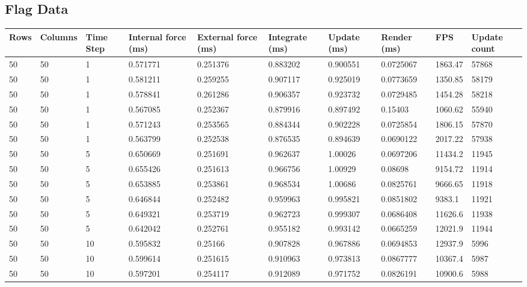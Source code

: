 \begin{landscape}
\subsection{Flag Data}

\begin{longtable}{ | l | l | l | l | l | l | l | l | l | l | }
\hline
 Rows &  Columns &  Time Step &  Internal force (ms) &  External force (ms) &  Integrate (ms) &  Update (ms) &  Render (ms) &  FPS &  Update count \\ \hline
50 & 50 & 1 & 0.571771 & 0.251376 & 0.883202 & 0.900551 & 0.0725067 & 1863.47 & 57868\\ \hline
50 & 50 & 1 & 0.581211 & 0.259255 & 0.907117 & 0.925019 & 0.0773659 & 1350.85 & 58179\\ \hline
50 & 50 & 1 & 0.578841 & 0.261286 & 0.906357 & 0.923732 & 0.0729485 & 1454.28 & 58218\\ \hline
50 & 50 & 1 & 0.567085 & 0.252367 & 0.879916 & 0.897492 & 0.15403 & 1060.62 & 55940\\ \hline
50 & 50 & 1 & 0.571243 & 0.253565 & 0.884344 & 0.902228 & 0.0725854 & 1806.15 & 57870\\ \hline
50 & 50 & 1 & 0.563799 & 0.252538 & 0.876535 & 0.894639 & 0.0690122 & 2017.22 & 57938\\ \hline
50 & 50 & 5 & 0.650669 & 0.251691 & 0.962637 & 1.00026 & 0.0697206 & 11434.2 & 11945\\ \hline
50 & 50 & 5 & 0.655426 & 0.251613 & 0.966756 & 1.00929 & 0.08698 & 9154.72 & 11914\\ \hline
50 & 50 & 5 & 0.653885 & 0.253861 & 0.968534 & 1.00686 & 0.0825761 & 9666.65 & 11918\\ \hline
50 & 50 & 5 & 0.646844 & 0.252482 & 0.959963 & 0.995821 & 0.0851802 & 9383.1 & 11921\\ \hline
50 & 50 & 5 & 0.649321 & 0.253719 & 0.962723 & 0.999307 & 0.0686408 & 11626.6 & 11938\\ \hline
50 & 50 & 5 & 0.642042 & 0.252761 & 0.955182 & 0.993142 & 0.0665259 & 12021.9 & 11944\\ \hline
50 & 50 & 10 & 0.595832 & 0.25166 & 0.907828 & 0.967886 & 0.0694853 & 12937.9 & 5996\\ \hline
50 & 50 & 10 & 0.599614 & 0.251615 & 0.910963 & 0.973813 & 0.0867777 & 10367.4 & 5987\\ \hline
50 & 50 & 10 & 0.597201 & 0.254117 & 0.912089 & 0.971752 & 0.0826191 & 10900.6 & 5988\\ \hline

\end{longtable}
\end{landscape}
